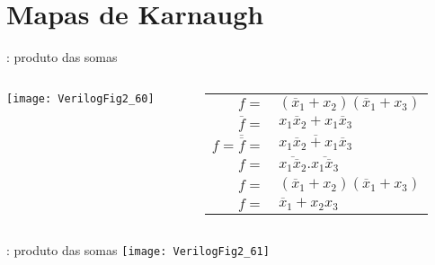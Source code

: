 

\subtitle{Mapas de Karnaugh} %




\begin{frame}
	\titlepage
\end{frame} 


\section{Mapas de Karnaugh}

\begin{frame}{\insertsection: produto das somas}
    \begin{columns}
        \begin{column}{0.50\textwidth}
            \vspace{3cm}
            \texttt{[image: VerilogFig2\_60]}
        \end{column}        
        \begin{column}{0.50\textwidth}
            \small
            \begin{tabular}{rl}
            $f=$ & $(\overline{x}_1 + x_2)(\overline{x}_1+x_3)$ \\[2ex]
            \pause
            $\overline{f}=$ & $x_1\overline{x}_2 + x_1\overline{x}_3$ \\[2ex]
            $f=\overline{\overline{f}}=$ & $\overline{x_1\overline{x}_2 + x_1\overline{x}_3}$ \\[2ex]
            $f=$ & $\overline{x_1\overline{x}_2}.\overline{x_1\overline{x}_3}$ \\[2ex]
            $f=$ & $(\overline{x}_1 + x_2)(\overline{x}_1+x_3)$ \\[2ex]
            \pause
            $f=$ & $\overline{x}_1 + x_2x_3$ \\[2ex]
            \end{tabular}
        \end{column}
    \end{columns}
\end{frame}

\begin{frame}{\insertsection: produto das somas}
    \centering
    \texttt{[image: VerilogFig2\_61]}
\end{frame}

